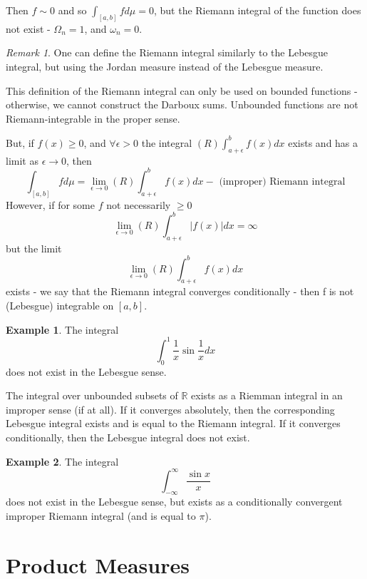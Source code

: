 \documentclass[11pt,a4paper]{report}
\theoremstyle{plain}
\theoremstyle{definition}
\newtheorem*{eg}{Example}
\theoremstyle{remark}
\newtheorem*{rem}{Remark}
\newcommand{\R}{\mathbb{R}}
\newcommand{\abs}[1]{\left| #1 \right|}
\begin{document}
Then $f \sim 0$ and so $\int_{[a, b]} f d\mu = 0$, but the Riemann integral of the function does not exist - $\Omega_n = 1$, and $\omega_n  = 0$.

\begin{rem}
    One can define the Riemann integral similarly to the Lebesgue integral, but using the Jordan measure instead of the Lebesgue measure.
\end{rem}

This definition of the Riemann integral can only be used on bounded functions - otherwise, we cannot construct the Darboux sums. Unbounded functions are not Riemann-integrable in the proper sense.

But, if $f(x) \ge 0$, and $\forall \epsilon > 0$ the integral $(R) \int_{a + \epsilon}^b f(x) dx$ exists and has a limit as $\epsilon \rightarrow 0$, then
$$ \int_{[a, b]} f d\mu = \lim_{\epsilon \rightarrow 0} (R) \int_{a + \epsilon}^b f(x) dx - \text{ (improper) Riemann integral} $$
However, if for some $f$ not necessarily $\ge 0$
$$ \lim_{\epsilon \rightarrow 0} (R) \int_{a + \epsilon}^b \abs{f(x)} d x = \infty $$
but the limit
$$ \lim_{\epsilon \rightarrow 0} (R) \int_{a + \epsilon}^b f(x) dx $$
exists - we say that the Riemann integral converges conditionally - then f is not (Lebesgue) integrable on $[a, b]$.

\begin{eg}
    The integral
    $$ \int_0^1 \frac{1}{x} \sin \frac{1}{x} dx $$
    does not exist in the Lebesgue sense.
\end{eg}

The integral over unbounded subsets of $\R$ exists as a Riemman integral in an improper sense (if at all). If it converges absolutely, then the corresponding Lebesgue integral exists and is equal to the Riemann integral. If it converges conditionally, then the Lebesgue integral does not exist.

\begin{eg}
    The integral
    $$ \int_{-\infty}^\infty \frac{\sin x}{x} $$
    does not exist in the Lebesgue sense, but exists as a conditionally convergent improper Riemann integral (and is equal to $\pi$).
\end{eg}


\chapter{Product Measures}
\end{document}
